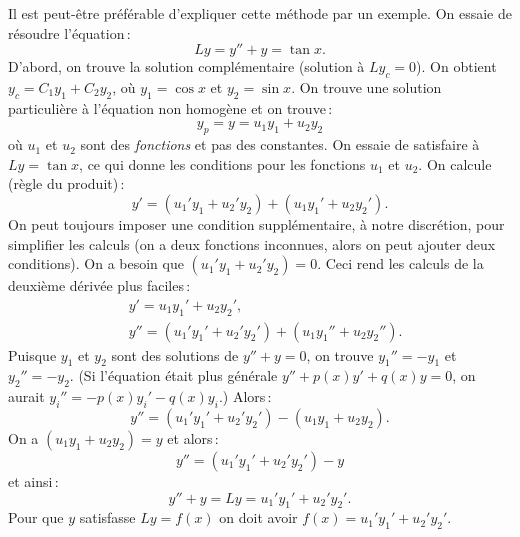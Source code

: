 Il est peut-être préférable d'expliquer cette méthode par un exemple. On essaie de résoudre l'équation\,:  
\begin{equation*}
Ly = y''+y = \tan x .
\end{equation*}
D'abord, on trouve la solution complémentaire (solution à $Ly_c = 0$).  
On obtient $y_c = C_1 y_1 + C_2 y_2$, où $y_1 = \cos x$ et $y_2 = \sin x$.
On trouve une solution particulière à l'équation non homogène et on trouve\,: 
\begin{equation*}
y_p = y = u_1 y_1 + u_2 y_2 
\end{equation*}
où $u_1$ et $u_2$ sont des \emph{fonctions} et pas des constantes.
On essaie de satisfaire à $Ly = \tan x$, ce qui donne les conditions pour les fonctions  $u_1$ et $u_2$.
On calcule (règle du produit)\,:  
\begin{equation*}
y' = (u_1' y_1 + u_2' y_2) + (u_1 y_1' + u_2 y_2').
\end{equation*}
On peut toujours imposer une condition supplémentaire, à notre discrétion, pour simplifier les calculs (on a deux fonctions inconnues, alors on peut ajouter deux conditions). On a besoin que 
$(u_1' y_1 + u_2' y_2) = 0$.  Ceci rend les calculs de la deuxième dérivée plus faciles\,: 
\begin{align*}
& y' = u_1 y_1' + u_2 y_2' , \\
& y'' = (u_1' y_1' + u_2' y_2') + (u_1 y_1'' + u_2 y_2'') .
\end{align*}
Puisque $y_1$ et $y_2$ sont des solutions de $y''+y = 0$, on trouve 
$y_1'' = - y_1$
et $y_2'' = - y_2$.
(Si l'équation était plus générale  $y''+p(x)y' +q(x)y = 0$, on aurait
$y_i'' = -p(x)y_i' -q(x)y_i$.) Alors\,: 
\begin{equation*}
y'' = (u_1' y_1' + u_2' y_2') - (u_1 y_1 + u_2 y_2) .
\end{equation*}
On a $(u_1 y_1 + u_2 y_2) = y$ et alors\,:
\begin{equation*}
y'' = (u_1' y_1' + u_2' y_2') - y 
\end{equation*}
et ainsi\,: 
\begin{equation*}
y'' + y = Ly = u_1' y_1' + u_2' y_2' .
\end{equation*}
Pour  que $y$ satisfasse $Ly = f(x)$ on doit avoir
$f(x) = u_1' y_1' + u_2' y_2'$.

